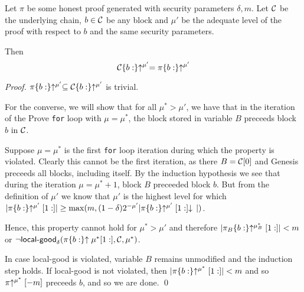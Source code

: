 \begin{lemma}\label{lem.allblocks}
Let $\pi$ be some honest proof generated with security parameters $\delta, m$.
Let $\mathcal{C}$ be the underlying chain, $b \in \mathcal{C}$ be any block and $\mu'$ be
the adequate level of the proof with respect to $b$ and the same security
parameters.

Then
\begin{equation*}
\mathcal{C}\{b:\}\negthickspace\uparrow^{\mu'} = \pi\{b:\}\negthickspace\uparrow^{\mu'}
\end{equation*}
\end{lemma}
\begin{proof}
    $\pi\{b:\}\negthickspace\uparrow^{\mu'} \subseteq \mathcal{C}\{b:\}\negthickspace\uparrow^{\mu'}$ is trivial.

    For the converse, we will show that for all $\mu^* > \mu'$, we have that in
    the iteration of the Prove \texttt{for} loop with $\mu = \mu^*$, the block
    stored in variable $B$ preceeds block $b$ in $\mathcal{C}$.

    Suppose $\mu = \mu^*$ is the first \texttt{for} loop iteration during which the
    property is violated. Clearly this cannot be the first iteration, as there
    $B = \mathcal{C}[0]$ and Genesis preceeds all blocks, including itself. By the
    induction hypothesis we see that during the iteration $\mu = \mu^* + 1$,
    block $B$ preceeded block $b$. But from the definition of $\mu'$ we know
    that $\mu'$ is the highest level for which
    $|\pi\{b:\}\negthickspace\uparrow^{\mu'}[1:]|
    \geq \max(m, (1 -
    \delta)2^{-\mu'}|\pi\{b:\}\negthickspace\uparrow^{\mu'}[1:]\negthickspace\downarrow\,|)$.

    Hence, this
    property cannot hold for $\mu^* > \mu'$ and therefore
    $|\pi_B\{b:\}\negthickspace\uparrow^{\mu_B^*}[1:]| < m$ or $\lnot
    \textsf{local-good}_\delta(\pi\{b:\}\negthickspace\uparrow{\mu^*}[1:], \mathcal{C}, \mu^*)$.

    In case \textsf{local-good} is violated, variable $B$ remains unmodified and
    the induction step holds. If \textsf{local-good} is not violated, then
    $|\pi\{b:\}\negthickspace\uparrow^{\mu^*}[1:]| < m$ and so $\pi\negthickspace\uparrow^{\mu^*}[-m]$
    preceeds $b$, and so we are done.
    \qed
\end{proof}



